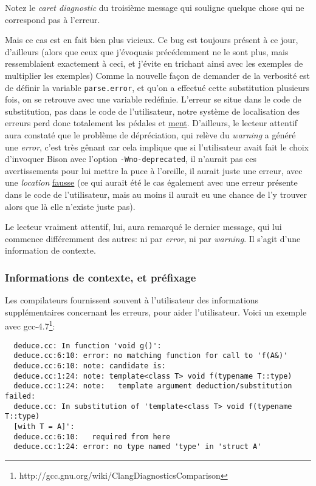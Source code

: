 \documentclass[a4paper,11pt,twoside,final]{article}
\begin{document}
  Notez le \textit{caret diagnostic} du troisième message qui souligne quelque
  chose qui ne correspond pas à l'erreur.

  Mais ce cas est en fait bien plus vicieux. Ce bug est toujours présent à ce
  jour, d'ailleurs (alors que ceux que j'évoquais précédemment ne le sont plus,
  mais ressemblaient exactement à ceci, et j'évite en trichant ainsi avec les
  exemples de multiplier les exemples) Comme la nouvelle façon de demander de
  la verbosité est de définir la variable \texttt{parse.error}, et qu'on a
  effectué cette substitution plusieurs fois, on se retrouve avec une variable
  redéfinie.  L'erreur se situe dans le code de substitution, pas dans le code
  de l'utilisateur, notre système de localisation des erreurs perd donc
  totalement les pédales et \underline{ment}. D'ailleurs, le lecteur attentif
  aura constaté que le problème de dépréciation, qui relève du \textit{warning}
  a généré une \textit{error}, c'est très gênant car cela implique que si
  l'utilisateur avait fait le choix d'invoquer Bison avec l'option
  \texttt{-Wno-deprecated}, il n'aurait pas ces avertissements pour lui mettre
  la puce à l'oreille, il aurait juste une erreur, avec une \textit{location}
  \underline{fausse} (ce qui aurait été le cas également avec une erreur
  présente dans le code de l'utilisateur, mais au moins il aurait eu une chance
  de l'y trouver alors que là elle n'existe juste pas).

  Le lecteur vraiment attentif, lui, aura remarqué le dernier message, qui lui
  commence différemment des autres: ni par \textit{error}, ni par
  \textit{warning}. Il s'agit d'une information de contexte.

  \subsubsection{Informations de contexte, et préfixage}

  Les compilateurs fournissent souvent à l'utilisateur des informations
  supplémentaires concernant les erreurs, pour aider l'utilisateur. Voici un
  exemple avec gcc-4.7\footnote{%
  http://gcc.gnu.org/wiki/ClangDiagnosticsComparison}:

  \begin{verbatim}
  deduce.cc: In function 'void g()':
  deduce.cc:6:10: error: no matching function for call to 'f(A&)'
  deduce.cc:6:10: note: candidate is:
  deduce.cc:1:24: note: template<class T> void f(typename T::type)
  deduce.cc:1:24: note:   template argument deduction/substitution failed:
  deduce.cc: In substitution of 'template<class T> void f(typename T::type)
  [with T = A]':
  deduce.cc:6:10:   required from here
  deduce.cc:1:24: error: no type named 'type' in 'struct A'
  \end{verbatim}
\end{document}
